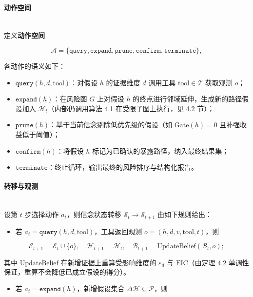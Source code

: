\documentclass[a4paper,12pt]{ctexart}
\begin{document}
\paragraph{动作空间}\mbox{}\\

定义\textbf{动作空间}

\[
\mathcal{A} = \{\texttt{query}, \texttt{expand}, \texttt{prune}, \texttt{confirm}, \texttt{terminate}\},
\]

各动作的语义如下：

\begin{itemize}[leftmargin=*]
\item $\texttt{query}(h, d, \text{tool})$：对假设 $h$ 的证据维度 $d$ 调用工具 $\text{tool} \in \mathcal{T}$ 获取观测 $o$；
\item $\texttt{expand}(h)$：在风险图 $G$ 上对假设 $h$ 的终点进行邻域延伸，生成新的路径假设加入 $\mathcal{H}_t$（内部仍调用算法 4.1 在受限子图上执行，见 4.2 节）；
\item $\texttt{prune}(h)$：基于当前信念剔除低优先级的假设（如 $\text{Gate}(h)=0$ 且补强收益低于阈值）；
\item $\texttt{confirm}(h)$：将假设 $h$ 标记为已确认的暴露路径，纳入最终结果集；
\item $\texttt{terminate}$：终止循环，输出最终的风险排序与结构化报告。
\end{itemize}

\paragraph{转移与观测}\mbox{}\\

设第 $t$ 步选择动作 $a_t$，则信念状态转移 $\mathcal{S}_t \to \mathcal{S}_{t+1}$ 由如下规则给出：

\begin{itemize}[leftmargin=*]
\item 若 $a_t = \texttt{query}(h, d, \text{tool})$，工具返回观测 $o = (h, d, v, \text{tool}, t)$，则
\end{itemize}

\[
\mathcal{E}_{t+1} = \mathcal{E}_t \cup \{o\}, \quad \mathcal{H}_{t+1} = \mathcal{H}_t, \quad \mathcal{B}_{t+1} = \text{UpdateBelief}(\mathcal{B}_t, o);
\]

  其中 $\text{UpdateBelief}$ 在新增证据上重算受影响维度的 $\varepsilon_d$ 与 $\text{EIC}$（由定理 4.2 单调性保证，重算不会降低已成立假设的得分）。

\begin{itemize}[leftmargin=*]
\item 若 $a_t = \texttt{expand}(h)$，新增假设集合 $\Delta\mathcal{H} \subseteq \mathcal{P}$，则
\end{itemize}
\end{document}
